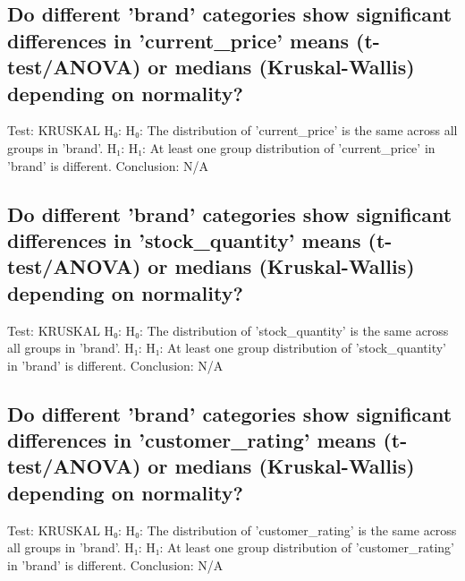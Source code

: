\documentclass{article}%
\begin{document}
%
\subsection{Do different 'brand' categories show significant differences in 'current\_price' means (t{-}test/ANOVA) or medians (Kruskal{-}Wallis) depending on normality?}%
\label{subsec:Dodifferentbrandcategoriesshowsignificantdifferencesincurrentpricemeans(t{-}test/ANOVA)ormedians(Kruskal{-}Wallis)dependingonnormality?}%
Test: KRUSKAL\newline%
H₀: H₀: The distribution of 'current\_price' is the same across all groups in 'brand'.\newline%
H₁: H₁: At least one group distribution of 'current\_price' in 'brand' is different.\newline%
Conclusion: N/A

%
\subsection{Do different 'brand' categories show significant differences in 'stock\_quantity' means (t{-}test/ANOVA) or medians (Kruskal{-}Wallis) depending on normality?}%
\label{subsec:Dodifferentbrandcategoriesshowsignificantdifferencesinstockquantitymeans(t{-}test/ANOVA)ormedians(Kruskal{-}Wallis)dependingonnormality?}%
Test: KRUSKAL\newline%
H₀: H₀: The distribution of 'stock\_quantity' is the same across all groups in 'brand'.\newline%
H₁: H₁: At least one group distribution of 'stock\_quantity' in 'brand' is different.\newline%
Conclusion: N/A

%
\subsection{Do different 'brand' categories show significant differences in 'customer\_rating' means (t{-}test/ANOVA) or medians (Kruskal{-}Wallis) depending on normality?}%
\label{subsec:Dodifferentbrandcategoriesshowsignificantdifferencesincustomerratingmeans(t{-}test/ANOVA)ormedians(Kruskal{-}Wallis)dependingonnormality?}%
Test: KRUSKAL\newline%
H₀: H₀: The distribution of 'customer\_rating' is the same across all groups in 'brand'.\newline%
H₁: H₁: At least one group distribution of 'customer\_rating' in 'brand' is different.\newline%
Conclusion: N/A
\end{document}
